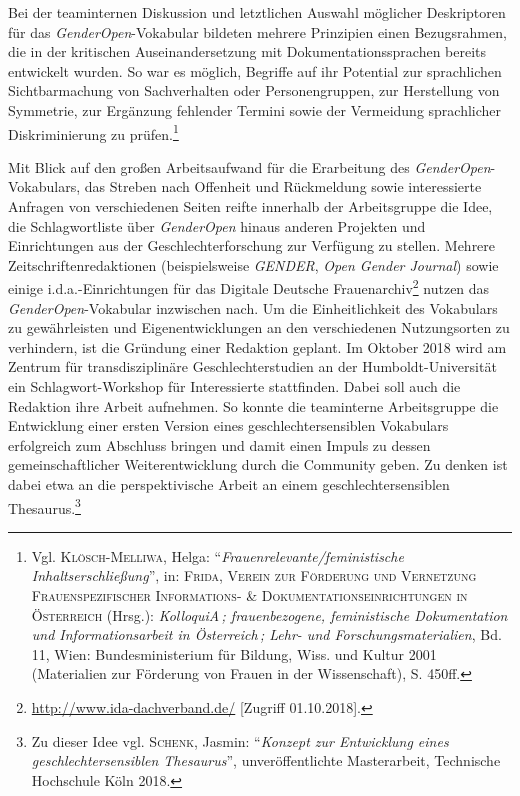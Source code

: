 \documentclass[a4paper,
fontsize=11pt,
oneside,
numbers=noperiodatend,
parskip=half-,
bibliography=totoc,
final
]{scrartcl}
\begin{document}
Bei der teaminternen Diskussion und letztlichen Auswahl möglicher
Deskriptoren für das \emph{GenderOpen}-Vokabular bildeten mehrere
Prinzipien einen Bezugsrahmen, die in der kritischen Auseinandersetzung
mit Dokumentationssprachen bereits entwickelt wurden. So war es möglich,
Begriffe auf ihr Potential zur sprachlichen Sichtbarmachung von
Sachverhalten oder Personengruppen, zur Herstellung von Symmetrie, zur
Ergänzung fehlender Termini sowie der Vermeidung sprachlicher
Diskriminierung zu prüfen.\footnote{Vgl. \textsc{Klösch-Melliwa}, Helga:
  \enquote{\emph{Frauenrelevante/feministische Inhaltserschließung}},
  in: \textsc{Frida, Verein zur Förderung und Vernetzung
  Frauenspezifischer Informations- \& Dokumentationseinrichtungen in
  Österreich} (Hrsg.): \emph{KolloquiA\,; frauenbezogene, feministische
  Dokumentation und Informationsarbeit in Österreich\,; Lehr- und
  Forschungsmaterialien}, Bd. 11, Wien: Bundesministerium für Bildung,
  Wiss. und Kultur 2001 (Materialien zur Förderung von Frauen in der
  Wissenschaft), S. 450ff.}

Mit Blick auf den großen Arbeitsaufwand für die Erarbeitung des
\emph{GenderOpen}-Vokabulars, das Streben nach Offenheit und Rückmeldung
sowie interessierte Anfragen von verschiedenen Seiten reifte innerhalb
der Arbeitsgruppe die Idee, die Schlagwortliste über \emph{GenderOpen}
hinaus anderen Projekten und Einrichtungen aus der Geschlechterforschung
zur Verfügung zu stellen. Mehrere Zeitschriftenredaktionen
(beispielsweise \emph{GENDER}, \emph{Open Gender Journal}) sowie einige
i.d.a.-Einrichtungen für das Digitale Deutsche Frauenarchiv\footnote{\href{http://www.ida-dachverband.de/ueber-ida/}{http://www.ida-dachverband.de/}
  {[}Zugriff 01.10.2018{]}.} nutzen das \emph{GenderOpen}-Vokabular
inzwischen nach. Um die Einheitlichkeit des Vokabulars zu gewährleisten
und Eigenentwicklungen an den verschiedenen Nutzungsorten zu verhindern,
ist die Gründung einer Redaktion geplant. Im Oktober 2018 wird am
Zentrum für transdisziplinäre Geschlechterstudien an der
Humboldt-Universität ein Schlagwort-Workshop für Interessierte
stattfinden. Dabei soll auch die Redaktion ihre Arbeit aufnehmen. So
konnte die teaminterne Arbeitsgruppe die Entwicklung einer ersten
Version eines geschlechtersensiblen Vokabulars erfolgreich zum Abschluss
bringen und damit einen Impuls zu dessen gemeinschaftlicher
Weiterentwicklung durch die Community geben. Zu denken ist dabei etwa an
die perspektivische Arbeit an einem geschlechtersensiblen
Thesaurus.\footnote{Zu dieser Idee vgl. \textsc{Schenk}, Jasmin:
  \enquote{\emph{Konzept zur Entwicklung eines geschlechtersensiblen
  Thesaurus}}, unveröffentlichte Masterarbeit, Technische Hochschule
  Köln 2018.}
\end{document}

